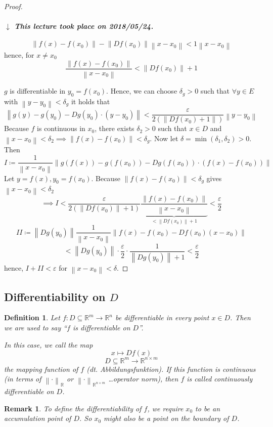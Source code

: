 \documentclass{article}
\newtheorem{definition}{Definition}  \numberwithin{definition}{section}
\newtheorem{remark}{Remark}  \numberwithin{remark}{section}
\newcommand{\norm}[1]{\left\|#1\right\|}
\newcommand{\dateref}[1]{%
  \begin{mdframed}[backgroundcolor=gray!10,innerbottommargin=0pt,innertopmargin=0pt]
    \paragraph{\textit{$\downarrow$ This lecture took place on #1.}}%
  \end{mdframed}%
}
\begin{document}
\begin{proof}
  \dateref{2018/05/24}

  \[ \norm{f(x) - f(x_0)} - \norm{Df(x_0)} \norm{x - x_0} < 1 \norm{x - x_0} \]
  hence, for $x \neq x_0$
  \[ \frac{\norm{f(x) - f(x_0)}}{\norm{x - x_0}} < \norm{Df(x_0)} + 1 \]

  $g$ is differentiable in $y_0 = f(x_0)$. Hence, we can choose $\delta_g > 0$ such that $\forall y \in E$ with $\norm{y - y_0} < \delta_g$
  it holds that
  \[ \norm{g(y) - g(y_0) - Dg(y_0) \cdot (y - y_0)} < \frac{\varepsilon}{2 \left(\norm{Df(x_0) + 1}\right)} \norm{y - y_0} \]
  Because $f$ is continuous in $x_0$, there exists $\delta_2 > 0$ such that $x \in D$ and $\norm{x - x_0} < \delta_2 \implies \norm{f(x) - f(x_0)} < \delta_g$.
  Now let $\delta = \min(\delta_1, \delta_2) > 0$. Then
  \[ I \coloneqq \frac{1}{\norm{x - x_0}} \norm{g(f(x)) - g(f(x_0)) - Dg(f(x_0)) \cdot (f(x) - f(x_0))} \]
  Let $y = f(x), y_0 = f(x_0)$.
  Because $\norm{f(x) - f(x_0)} < \delta_g$ gives $\norm{x - x_0} < \delta_2$
  \[ \implies I < \frac{\varepsilon}{2 \left(\norm{Df(x_0)} + 1\right)} \underbrace{\frac{\norm{f(x) - f(x_0)}}{\norm{x - x_0}}}_{< \norm{Df(x_0)} + 1} < \frac\varepsilon2 \]
  \[ II \coloneqq \norm{Dg(y_0)} \frac{1}{\norm{x - x_0}} \norm{f(x) - f(x_0) - Df(x_0) (x - x_0)} \]
  \[ < \norm{Dg(y_0)} \cdot \frac{\varepsilon}{2} \cdot \frac{1}{\norm{Dg(y_0)} + 1} < \frac\varepsilon2 \]
  hence, $I + II < \varepsilon$ for $\norm{x - x_0} < \delta$.
\end{proof}

\subsection{Differentiability on $D$}
\begin{definition}
  Let $f: D \subseteq \mathbb R^m \to \mathbb R^n$ be differentiable in every point $x \in D$.
  Then we are used to say \enquote{$f$ is differentiable \emph{on} $D$}.

  In this case, we call the map
  \[ x \mapsto Df(x) \]
  \[ D \subseteq \mathbb R^m \to \mathbb R^{n \times m} \]
  the mapping function of $f$ (dt. \foreignlanguage{german}{Abbildungsfunktion}).
  If this function is continuous (in terms of $\norm{\cdot}_{\mathbb R}$ or $\norm{\cdot}_{\mathbb R^{n \times m}}$ \dots operator norm),
  then $f$ is called continuously differentiable on $D$.
\end{definition}

\begin{remark}
  To define the differentiability of $f$, we require $x_0$ to be an accumulation point of $D$.
  So $x_0$ might also be a point on the boundary of $D$.
\end{remark}
\end{document}
